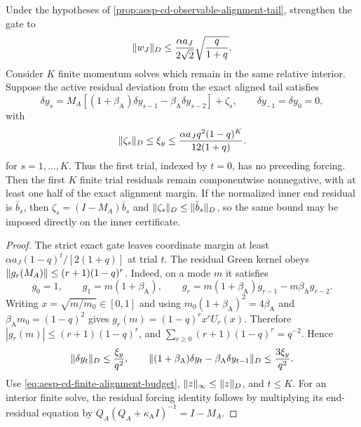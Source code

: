 \begin{corollary}
\label{cor:aesp-cd-finite-alignment-tail}
Under the hypotheses of
\cref{prop:aesp-cd-observable-alignment-tail}, strengthen the gate to
\begin{equation*}
 \lVert w_J\rVert_D
 \leq\frac{\alpha a_J}{2\sqrt2}\sqrt{\frac q{1+q}}.
\end{equation*}
Consider $K$ finite momentum solves which remain in the same relative
interior.  Suppose the active residual deviation from the exact aligned tail
satisfies
\begin{equation*}
 \delta y_s=M_A[(1+\beta_{\mathrm A})\delta y_{s-1}
                 -\beta_{\mathrm A}\delta y_{s-2}]+\zeta_s,
 \qquad \delta y_{-1}=\delta y_0=0,
\end{equation*}
with
\begin{equation}
 \lVert\zeta_s\rVert_D\leq\xi_y
 \leq\frac{\alpha a_Jq^2(1-q)^K}{12(1+q)}.
 \label{eq:aesp-cd-finite-alignment-budget}
\end{equation}
for $s=1,\ldots,K$.  Thus the first trial, indexed by $t=0$, has no
preceding forcing.
Then the first $K$ finite trial residuals remain componentwise nonnegative,
with at least one half of the exact alignment margin.  If the normalized inner
end residual is $\bar b_s$, then
$\zeta_s=(I-M_A)\bar b_s$ and
$\lVert\zeta_s\rVert_D\leq\lVert\bar b_s\rVert_D$, so the same bound may be imposed
directly on the inner certificate.
\end{corollary}

\begin{proof}
The strict exact gate leaves coordinate margin at least
$\alpha a_J(1-q)^t/[2(1+q)]$ at trial $t$.  The residual Green kernel obeys
$\lVert g_r(M_A)\rVert\leq(r+1)(1-q)^r$.  Indeed, on a mode $m$ it satisfies
\begin{equation*}
 g_0=1,\qquad g_1=m(1+\beta_{\mathrm A}),\qquad
 g_r=m(1+\beta_{\mathrm A})g_{r-1}-m\beta_{\mathrm A}g_{r-2}.
\end{equation*}
Writing $x=\sqrt{m/m_0}\in[0,1]$ and using
$m_0(1+\beta_{\mathrm A})^2=4\beta_{\mathrm A}$ and
$\beta_{\mathrm A}m_0=(1-q)^2$ gives
$g_r(m)=(1-q)^r x^r U_r(x)$.  Therefore
$|g_r(m)|\leq(r+1)(1-q)^r$, and
$\sum_{r\geq0}(r+1)(1-q)^r=q^{-2}$.  Hence
\begin{equation*}
 \lVert\delta y_t\rVert_D\leq\frac{\xi_y}{q^2},
 \qquad
 \lVert(1+\beta_{\mathrm A})\delta y_t
       -\beta_{\mathrm A}\delta y_{t-1}\rVert_D
 \leq\frac{3\xi_y}{q^2}.
\end{equation*}
Use \cref{eq:aesp-cd-finite-alignment-budget},
$\lVert z\rVert_\infty\leq\lVert z\rVert_D$, and $t\leq K$.
For an interior finite solve, the residual forcing identity follows by
multiplying its end-residual equation by $Q_A(Q_A+\kappa_{\mathrm A}I)^{-1}
=I-M_A$.
\end{proof}

